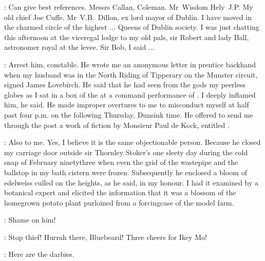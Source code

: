 
\Bloom:
Can give best references.
Messrs Callan, Coleman.
Mr~Wisdom Hely~J.P.
My old chief Joe Cuffe.
Mr~V.B.~Dillon, ex lord mayor of Dublin.
I have moved in the charmed circle of the highest ...
Queens of Dublin society.
I was just chatting this afternoon
at the viceregal lodge to my old pals, sir Robert and lady Ball,
astronomer royal at the levee.
Sir Bob, I said ...

\Yelverton:
Arrest him, constable.
He wrote me an anonymous letter in prentice backhand
when my husband was in the North Riding of Tipperary on the Munster circuit,
signed James Lovebirch.
He said that he had seen from the gods my peerless globes as I sat in a box
of the  at a command performance of .
I deeply inflamed him, he said.
He made improper overtures to me to misconduct
myself at half past four p.m.
on the following Thursday, Dunsink time.
He offered to send me through the post a work of fiction by Monsieur Paul de
Kock, entitled .

\Bellingham:
Also to me.
Yes, I believe it is the same objectionable person.
Because he closed my carriage door outside sir Thornley Stoker's
one sleety day during the cold snap of February ninetythree
when even the grid of the wastepipe
and the ballstop in my bath cistern were frozen.
Subsequently he enclosed a bloom of edelweiss culled on the heights,
as he said, in my honour.
I had it examined by a botanical expert
and elicited the information that it was
a blossom of the homegrown potato plant
purloined from a forcingcase of the model farm.

\Yelverton:
Shame on him!


\Ragamuffins:
Stop thief!
Hurrah there, Bluebeard!
Three cheers for Ikey Mo!

\SecondWatch:
Here are the darbies.


